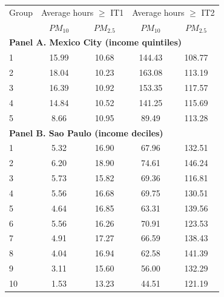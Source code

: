 \begin{tabular}{lcc|cc}
    \toprule
    \toprule
    Group & \multicolumn{2}{c|}{Average hours $\geq$ IT1} & \multicolumn{2}{c}{Average hours $\geq$ IT2} \\
    & $PM_{10}$ & $PM_{2.5}$ & $PM_{10}$ & $PM_{2.5}$ \\
    \midrule
    \multicolumn{5}{l}{\textbf{Panel A. Mexico City (income quintiles)}} \\
    \midrule
    1 & 15.99 & 10.68 & 144.43 & 108.77 \\
    2 & 18.04 & 10.23 & 163.08 & 113.19 \\
    3 & 16.39 & 10.92 & 153.35 & 117.57 \\
    4 & 14.84 & 10.52 & 141.25 & 115.69 \\
    5 & 8.66 & 10.95 & 89.49 & 113.28 \\
    \midrule
    \multicolumn{5}{l}{\textbf{Panel B. Sao Paulo (income deciles)}} \\
    \midrule
    1 & 5.32 & 16.90 & 67.96 & 132.51 \\
    2 & 6.20 & 18.90 & 74.61 & 146.24 \\
    3 & 5.73 & 15.82 & 69.36 & 116.81 \\
    4 & 5.56 & 16.68 & 69.75 & 130.51 \\
    5 & 4.64 & 16.85 & 63.31 & 139.56 \\
    6 & 5.56 & 16.26 & 70.91 & 123.53 \\
    7 & 4.91 & 17.27 & 66.59 & 138.43 \\
    8 & 4.04 & 16.94 & 62.58 & 141.39 \\
    9 & 3.11 & 15.60 & 56.00 & 132.29 \\
    10 & 1.53 & 13.23 & 44.51 & 121.19 \\
    \bottomrule
    \bottomrule
\end{tabular}
